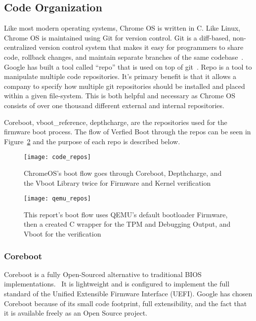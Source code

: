 \documentclass[../report.tex]{subfiles}
\begin{document}
\subsection{Code Organization}

Like most modern operating systems, Chrome OS is written in C.
Like Linux, Chrome OS is maintained using Git for version control. 
Git is a diff-based, non-centralized version control system that makes it easy for programmers to share code, rollback changes, and maintain separate branches of the same codebase~\cite{git}.
Google has built a tool called ``repo'' that is used on top of git~\cite{repo}. 
Repo is a tool to manipulate multiple code repositories. 
It's primary benefit is that it allows a company to specify how multiple git repositories should be installed and placed within a given file-system.
This is both helpful and necessary as Chrome OS consists of over one thousand different external and internal repositories. 

Coreboot, vboot\_reference, depthcharge, are the repositories used for the firmware boot process.
The flow of Verfied Boot through the repos can be seen in
Figure~\ref{fig:code_repos} and the purpose of each repo is described below.

\begin{figure}
  \centering
  \texttt{[image: code\_repos]}
  \caption{ChromeOS's boot flow goes through Coreboot, Depthcharge, and the Vboot Library twice for Firmware and Kernel verification}
  \label{fig:code_repos}
\end{figure}
\begin{figure}
  \centering
  \texttt{[image: qemu\_repos]}
  \caption{This report's boot flow uses QEMU's default bootloader Firmware, then
  a created C wrapper for the TPM and Debugging Output, and Vboot for the
  verification}
  \label{fig:code_repos}
\end{figure}

\subsubsection{Coreboot}\label{coreboot}

Coreboot is a fully Open-Sourced alternative to traditional BIOS implementations.~\cite{coreboot}
It is lightweight and is configured to implement the full standard of the Unified Extensible Firmware Interface (UEFI).
Google has chosen Coreboot because of its small code footprint, full extensibility, and the fact that it is available freely as an Open Source project.
\end{document}
